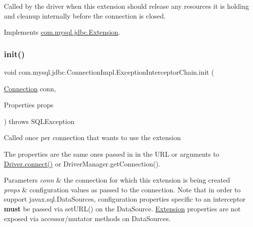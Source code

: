 Called by the driver when this extension should release any resources it is holding and cleanup internally before the connection is closed. 

Implements \mbox{\hyperlink{interfacecom_1_1mysql_1_1jdbc_1_1_extension_a7d9644de305efed5df71f3fcc7cc1772}{com.\+mysql.\+jdbc.\+Extension}}.

\mbox{\label{classcom_1_1mysql_1_1jdbc_1_1_connection_impl_1_1_exception_interceptor_chain_a0b1980a96fabc8955a709b3b25492dd1}} 
\subsubsection{\texorpdfstring{init()}{init()}}
{\footnotesize\ttfamily void com.\+mysql.\+jdbc.\+Connection\+Impl.\+Exception\+Interceptor\+Chain.\+init (\begin{DoxyParamCaption}\item[{\mbox{\hyperlink{interfacecom_1_1mysql_1_1jdbc_1_1_connection}{Connection}}}]{conn,  }\item[{Properties}]{props }\end{DoxyParamCaption}) throws S\+Q\+L\+Exception}

Called once per connection that wants to use the extension

The properties are the same ones passed in in the U\+RL or arguments to \mbox{\hyperlink{classcom_1_1mysql_1_1jdbc_1_1_non_registering_driver_a834c012e752a01d1ee435b3461bb8218}{Driver.\+connect()}} or Driver\+Manager.\+get\+Connection().


\begin{DoxyParams}{Parameters}
{\em conn} & the connection for which this extension is being created \\
\hline
{\em props} & configuration values as passed to the connection. Note that in order to support javax.\+sql.\+Data\+Sources, configuration properties specific to an interceptor {\bfseries must} be passed via set\+U\+R\+L() on the Data\+Source. \mbox{\hyperlink{interfacecom_1_1mysql_1_1jdbc_1_1_extension}{Extension}} properties are not exposed via accessor/mutator methods on Data\+Sources.\\
\hline
\end{DoxyParams}

